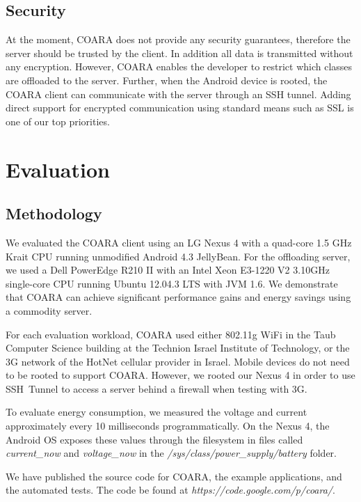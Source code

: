 \documentclass[10pt,journal,cspaper,compsoc]{IEEEtran}
\begin{document}
{\subsection{Security}
At the moment, COARA does not provide any security guarantees, therefore the server should be trusted by the client.  In addition all data is transmitted without any encryption.  However, COARA enables the developer to restrict which classes are offloaded to the server.  Further, when the Android device is rooted, the COARA client can communicate with the server through an SSH tunnel.
Adding direct support for encrypted communication using standard means such as SSL is one of our top priorities.


\section{Evaluation}
\label{sec:evaluation}


\subsection{Methodology}
We evaluated the COARA client using an LG Nexus 4 with a \mbox{quad-core} 1.5 GHz Krait CPU running unmodified Android 4.3 JellyBean.  For the offloading server, we used a Dell PowerEdge R210 II with an Intel Xeon E3-1220 V2 3.10GHz single-core CPU running Ubuntu 12.04.3 LTS with JVM 1.6.  We demonstrate that COARA can achieve significant performance gains and energy savings using a commodity server.

For each evaluation workload, COARA used either 802.11g WiFi in the Taub Computer Science building at the Technion Israel Institute of Technology,  or the 3G network of the HotNet cellular provider in Israel.   Mobile devices do not need to be rooted to support COARA.  However, we rooted our Nexus 4 in order to use \mbox{SSH Tunnel} \cite{SSHTunnel:Online} to access a server behind a firewall when testing with 3G.

To evaluate energy consumption, we measured the voltage and current approximately every 10 milliseconds programmatically.  On the Nexus 4, the Android OS exposes these values through the filesystem in files called \emph{current\_now} and \emph{voltage\_now} in the \emph{/sys/class/power\_supply/battery} folder.

We have published the source code for COARA, the example applications, and the automated tests.  The code be found at \emph{https://code.google.com/p/coara/}.


}
\end{document}
